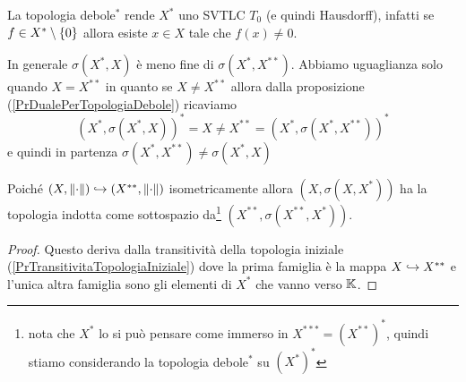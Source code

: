 \begin{remark}
La topologia debole$^\ast$ rende $X^\ast$ uno SVTLC $T_0$ (e quindi Hausdorff), infatti se $f\in X^\ast\setminus\{0\}$ allora esiste $x\in X$ tale che $f(x)\neq 0$.
\end{remark}

\begin{remark}
In generale $\sigma(X^\ast,X)$ \`e meno fine di $\sigma(X^\ast,X^{\ast\ast})$. Abbiamo uguaglianza solo quando $X=X^{\ast\ast}$ in quanto se $X\neq X^{\ast\ast}$ allora dalla proposizione (\ref{PrDualePerTopologiaDebole}) ricaviamo
\[(X^\ast,\sigma(X^\ast,X))^\ast=X\neq X^{\ast\ast}=(X^\ast,\sigma(X^\ast,X^{\ast\ast}))^\ast\]
e quindi in partenza $\sigma(X^\ast,X^{\ast\ast})\neq \sigma(X^\ast,X)$
\end{remark}

\begin{remark}
Poich\'e $(X,\left\Vert{\cdot}\right\Vert)\hookrightarrow (X^{\ast\ast},\left\Vert{\cdot}\right\Vert)$ isometricamente allora $(X,\sigma(X,X^\ast))$ ha la topologia indotta come sottospazio da\footnote{nota che $X^\ast$ lo si pu\`o pensare come immerso in $X^{\ast\ast\ast}=(X^{\ast\ast})^\ast$, quindi stiamo considerando la topologia debole$^\ast$ su $(X^{\ast})^\ast$} $(X^{\ast\ast},\sigma(X^{\ast\ast},X^\ast))$.
\end{remark}
\begin{proof}
Questo deriva dalla transitivit\`a della topologia iniziale (\ref{PrTransitivitaTopologiaIniziale}) dove la prima famiglia \`e la mappa $X\hookrightarrow X^{\ast\ast}$ e l'unica altra famiglia sono gli elementi di $X^\ast$ che vanno verso $\mathbb{K}$.
\end{proof}



